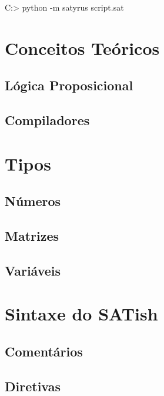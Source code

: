 \documentclass[12pt]{satyrus}
\begin{document}
	
	\begin{shell}
	C:\Users\User> python -m satyrus script.sat
	\end{shell}

    \chapter{Conceitos Teóricos}

    \section{Lógica Proposicional}
    
    \section{Compiladores}
    
    \chapter{Tipos}
    
    \section{Números}
    
    \section{Matrizes}
    
    \section{Variáveis}
    
    \chapter{Sintaxe do SATish}
    
    \section{Comentários}
    
    \section{Diretivas}
    
\end{document}
